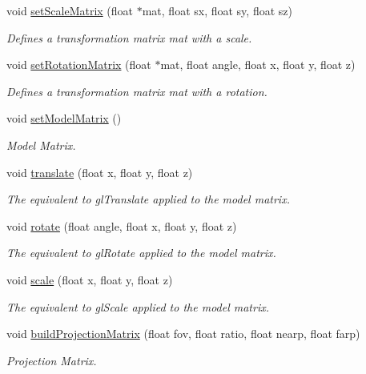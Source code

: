 \begin{DoxyCompactItemize}
void \hyperlink{model_8cu_a9705f0ad26d5379e263aeb4927950db8}{set\-Scale\-Matrix} (float $\ast$mat, float sx, float sy, float sz)
\begin{DoxyCompactList}\small\item\em Defines a transformation matrix mat with a scale. \end{DoxyCompactList}\item 
void \hyperlink{model_8cu_a8547e94c714309e7882a52566964b557}{set\-Rotation\-Matrix} (float $\ast$mat, float angle, float x, float y, float z)
\begin{DoxyCompactList}\small\item\em Defines a transformation matrix mat with a rotation. \end{DoxyCompactList}\item 
void \hyperlink{model_8cu_ac4ba5a776bb9805306fec00fa0772259}{set\-Model\-Matrix} ()
\begin{DoxyCompactList}\small\item\em Model Matrix. \end{DoxyCompactList}\item 
void \hyperlink{model_8cu_a9081ed23141a5980f028b21d58fa3290}{translate} (float x, float y, float z)
\begin{DoxyCompactList}\small\item\em The equivalent to gl\-Translate applied to the model matrix. \end{DoxyCompactList}\item 
void \hyperlink{model_8cu_ab3b8db7f0ed2eec710acf359c7be9967}{rotate} (float angle, float x, float y, float z)
\begin{DoxyCompactList}\small\item\em The equivalent to gl\-Rotate applied to the model matrix. \end{DoxyCompactList}\item 
void \hyperlink{model_8cu_ad6688b67f371ae87f750cbe01c904b67}{scale} (float x, float y, float z)
\begin{DoxyCompactList}\small\item\em The equivalent to gl\-Scale applied to the model matrix. \end{DoxyCompactList}\item 
void \hyperlink{model_8cu_aa46b1b84d330a69633de3893536fd2aa}{build\-Projection\-Matrix} (float fov, float ratio, float nearp, float farp)
\begin{DoxyCompactList}\small\item\em Projection Matrix. \end{DoxyCompactList}\item 

\end{DoxyCompactItemize}
